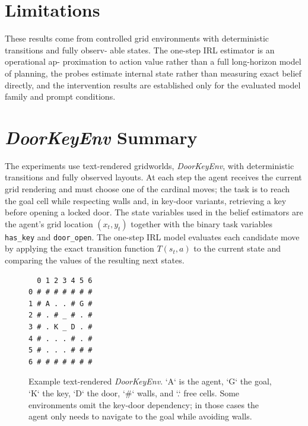 \documentclass[10pt,twocolumn]{article}
\begin{document}
\section{Limitations}
These results come from controlled grid
environments with deterministic transitions and fully observ-
able states. The one-step IRL estimator is an operational ap-
proximation to action value rather than a full long-horizon
model of planning, the probes estimate internal state rather than
measuring exact belief directly, and the intervention results are
established only for the evaluated model family and prompt
conditions.

\section{\textit{DoorKeyEnv} Summary}
\label{app:environment}
The experiments use text-rendered gridworlds, \textit{DoorKeyEnv}, with deterministic
transitions and fully observed layouts. At each step the agent receives the
current grid rendering and must choose one of the cardinal moves; the task is
to reach the goal cell while respecting walls and, in key-door variants,
retrieving a key before opening a locked door. The state variables used in the
belief estimators are the agent's grid location $(x_t,y_t)$ together with the
binary task variables \texttt{has\_key} and \texttt{door\_open}. The one-step
IRL model evaluates each candidate move by applying the exact transition
function $T(s_t,a)$ to the current state and comparing the values of the
resulting next states.
\begin{figure}[!ht]
\centering
    \centering
    \begin{BVerbatim}
  0 1 2 3 4 5 6 
0 # # # # # # # 
1 # A . . # G # 
2 # . # _ # . # 
3 # . K _ D . # 
4 # . . . # . # 
5 # . . . # # # 
6 # # # # # # # 
    \end{BVerbatim}
\caption{Example text-rendered \textit{DoorKeyEnv}. `A` is the agent, `G` the goal,
`K` the key, `D` the door, `#` walls, and `.` free cells. Some environments
omit the key-door dependency; in those cases the agent only needs to navigate
to the goal while avoiding walls.}
\label{fig:doorkey_example_appendix}
\end{figure}
\end{document}
